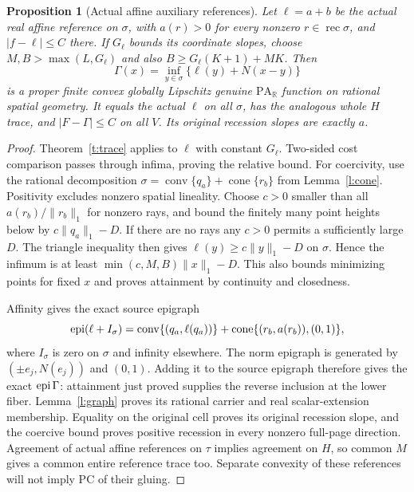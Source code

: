 \documentclass[11pt]{article}
\newtheorem{proposition}[theorem]{Proposition}
\theoremstyle{definition}\newtheorem{definition}[theorem]{Definition}
\theoremstyle{remark}\newtheorem{remark}[theorem]{Remark}
\newcommand{\R}{\mathbb R}\newcommand{\Q}{\mathbb Q}
\newcommand{\conv}{\operatorname{conv}}\newcommand{\cone}{\operatorname{cone}}
\newcommand{\rec}{\operatorname{rec}}\newcommand{\aff}{\operatorname{aff}}
\newcommand{\PA}{\mathrm{PA}}\newcommand{\dist}{\operatorname{dist}}
\begin{document}
\begin{proposition}[Actual affine auxiliary references]\label{p:aux}
Let $\ell=a+b$ be the actual real affine reference on $\sigma$, with $a(r)>0$ for every nonzero $r\in\rec\sigma$, and $|f-\ell|\leq C$ there. If $G_\ell$ bounds its coordinate slopes, choose $M,B>\max(L,G_\ell)$ and also $B\geq G_\ell(K+1)+MK$. Then
\[
 \Gamma(x)=\inf_{y\in\sigma}\{\ell(y)+N(x-y)\}
\]
is a proper finite convex globally Lipschitz genuine $\PA_\R$ function on rational spatial geometry. It equals the actual $\ell$ on all $\sigma$, has the analogous whole $H$ trace, and $|F-\Gamma|\leq C$ on all $V$. Its original recession slopes are exactly $a$.
\end{proposition}
\begin{proof}
Theorem~\ref{t:trace} applies to $\ell$ with constant $G_\ell$. Two-sided cost comparison passes through infima, proving the relative bound. For coercivity, use the rational decomposition $\sigma=\conv\{q_a\}+\cone\{r_b\}$ from Lemma~\ref{l:cone}. Positivity excludes nonzero spatial lineality. Choose $c>0$ smaller than all $a(r_b)/\|r_b\|_1$ for nonzero rays, and bound the finitely many point heights below by $c\|q_a\|_1-D$. If there are no rays any $c>0$ permits a sufficiently large $D$. The triangle inequality then gives $\ell(y)\geq c\|y\|_1-D$ on $\sigma$. Hence the infimum is at least $\min(c,M,B)\|x\|_1-D$. This also bounds minimizing points for fixed $x$ and proves attainment by continuity and closedness.

Affinity gives the exact source epigraph
\[
 \epi(\ell+I_\sigma)=\conv\{(q_a,\ell(q_a))\}
 +\cone\{(r_b,a(r_b)),(0,1)\},
\]
where $I_\sigma$ is zero on $\sigma$ and infinity elsewhere. The norm epigraph is generated by $(\pm e_j,N(e_j))$ and $(0,1)$. Adding it to the source epigraph therefore gives the exact $\operatorname{epi}\Gamma$: attainment just proved supplies the reverse inclusion at the lower fiber. Lemma~\ref{l:graph} proves its rational carrier and real scalar-extension membership. Equality on the original cell proves its original recession slope, and the coercive bound proves positive recession in every nonzero full-page direction. Agreement of actual affine references on $\tau$ implies agreement on $H$, so common $M$ gives a common entire reference trace too. Separate convexity of these references will not imply PC of their gluing.
\end{proof}
\end{document}
